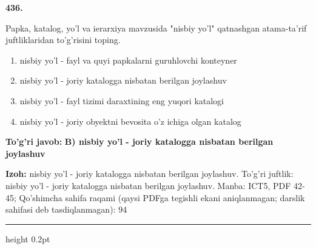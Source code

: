 \documentclass[10pt,a4paper]{article}
\begin{document}
{\bfseries\sffamily\color{ink} 436.}
\par
Papka, katalog, yo'l va ierarxiya mavzusida "nisbiy yo'l" qatnashgan atama-ta'rif juftliklaridan to'g'risini toping.
\begin{enumerate}[label=\Alph*),leftmargin=9mm]
\item nisbiy yo'l - fayl va quyi papkalarni guruhlovchi konteyner
\item nisbiy yo'l - joriy katalogga nisbatan berilgan joylashuv
\item nisbiy yo'l - fayl tizimi daraxtining eng yuqori katalogi
\item nisbiy yo'l - joriy obyektni bevosita o'z ichiga olgan katalog
\end{enumerate}
\begin{tcolorbox}[enhanced,breakable,colback=teal!4,colframe=teal!60!black,boxrule=0.45pt,arc=1.2mm,left=2.7mm,right=2.7mm,top=1.8mm,bottom=1.8mm,before skip=2mm,after skip=2mm]
{\bfseries\sffamily\color{teal}To'g'ri javob:} \textbf{B) nisbiy yo'l - joriy katalogga nisbatan berilgan joylashuv}
\par\smallskip
{\bfseries Izoh:} nisbiy yo'l - joriy katalogga nisbatan berilgan joylashuv. To'g'ri juftlik: nisbiy yo'l - joriy katalogga nisbatan berilgan joylashuv. Manba: ICT5, PDF 42-45; Qo'shimcha sahifa raqami (qaysi PDFga tegishli ekani aniqlanmagan; darslik sahifasi deb tasdiqlanmagan): 94
\end{tcolorbox}
\vspace{2mm}\hrule height 0.2pt\vspace{3mm}
\end{document}
